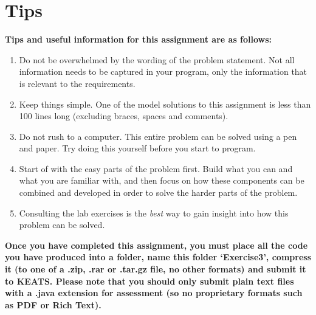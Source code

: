 \documentclass[11pt]{article}
\begin{document}
\section{Tips}

\textbf{Tips and useful information for this assignment are as follows:}

\begin{enumerate}

	\item Do not be overwhelmed by the wording of the problem statement. Not all information needs to be captured in your program, only the information that is relevant to the requirements.
	
	\item Keep things simple. One of the model solutions to this assignment is less than 100 lines long (excluding braces, spaces and comments).
	
	\item Do not rush to a computer. This entire problem can be solved using a pen and paper. Try doing this yourself before you start to program.

	\item Start of with the easy parts of the problem first. Build what you can and what you are familiar with, and then focus on how these components can be combined and developed in order to solve the harder parts of the problem.
	
	\item Consulting the lab exercises is the \emph{best} way to gain insight into how this problem can be solved.
	
\end{enumerate}

\textbf{Once you have completed this assignment, you must place all the code you have produced into a folder, name this folder `Exercise3', compress it (to one of a .zip, .rar or .tar.gz file, no other formats) and submit it to KEATS. Please note that you should only submit plain text files with a .java extension for assessment (so no proprietary formats such as PDF or Rich Text).}
\end{document}
